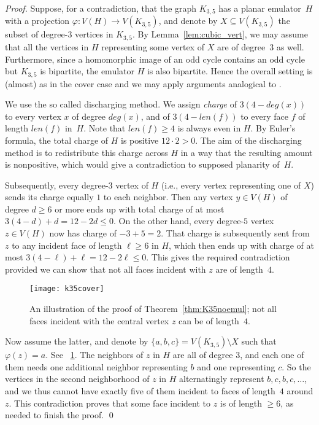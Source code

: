 \documentclass[envcountsect,envcountsame]{llncs}
\renewenvironment{accumulate}{}{}
\begin{document}
\begin{accumulate}
\begin{proof}
Suppose, for a contradiction, that the graph $K_{3,5}$ has a planar
emulator~$H$ with a projection $\varphi:V(H)\to V(K_{3,5})$, 
and denote by $X\subseteq V(K_{3,5})$ the subset of degree-$3$ vertices in $K_{3,5}$.
By Lemma~\ref{lem:cubic_vert}, we may assume that all the vertices in $H$
representing some vertex of $X$ are of degree~$3$ as well.
Furthermore, since a homomorphic image of an odd cycle contains an odd cycle
but $K_{3,5}$ is bipartite,
the emulator $H$ is also bipartite.
Hence the overall setting is (almost) as in the cover case and we may apply
arguments analogical to \cite{cit:hunekecov,cit:20years}.

We use the so called discharging method.
We assign {\em charge} of $3(4-deg(x))$ to every vertex $x$ of degree $deg(x)$,
and of $3(4-len(f))$ to every face $f$ of length $len(f)$ in~$H$.
Note that $len(f)\geq4$ is always even in $H$.
By Euler's formula, the total charge of $H$ is positive $12\cdot2>0$.
The aim of the discharging method is to redistribute this charge across $H$
in a way that the resulting amount is nonpositive,
which would give a contradiction to supposed planarity of~$H$.

Subsequently, every degree-$3$ vertex of $H$ (i.e., every vertex representing one of $X$)
sends its charge equally $1$ to each neighbor.
Then any vertex $y\in V(H)$ of degree $d\geq6$ or more ends up with total charge
of at most $3(4-d)+d=12-2d\leq0$.
On the other hand, every degree-$5$ vertex $z\in V(H)$ now has charge of $-3+5=2$.
That charge is subsequently sent from $z$ to any incident face
of length $\ell\geq6$ in $H$,
which then ends up with charge of at most $3(4-\ell)+\ell=12-2\ell\leq0$.
This gives the required contradiction provided we can show that not all
faces incident with $z$ are of length~$4$.

\begin{figure}[tb]
\centering
\texttt{[image: k35cover]}
\caption{An illustration of the proof of Theorem~\ref{thm:K35noemul};
	not all faces incident with the central vertex $z$ can be of length~$4$.}
\label{fig:K35cov}
\end{figure}

Now assume the latter,
and denote by $\{a,b,c\}=V(K_{3,5})\setminus X$ such that $\varphi(z)=a$.
See \figurename~\ref{fig:K35cov}.
The neighbors of $z$ in $H$ are all of degree $3$, and each one of them needs one
additional neighbor representing $b$ and one representing $c$.
So the vertices in the second neighborhood of $z$ in $H$ 
alternatingly represent $b,c,b,c,\dots$,
and we thus cannot have exactly five of them incident to faces of
length~$4$ around $z$.
This contradiction proves that some face incident to $z$ is of length
$\geq6$, as needed to finish the proof.
\qed\end{proof}

\end{accumulate}
\end{document}

